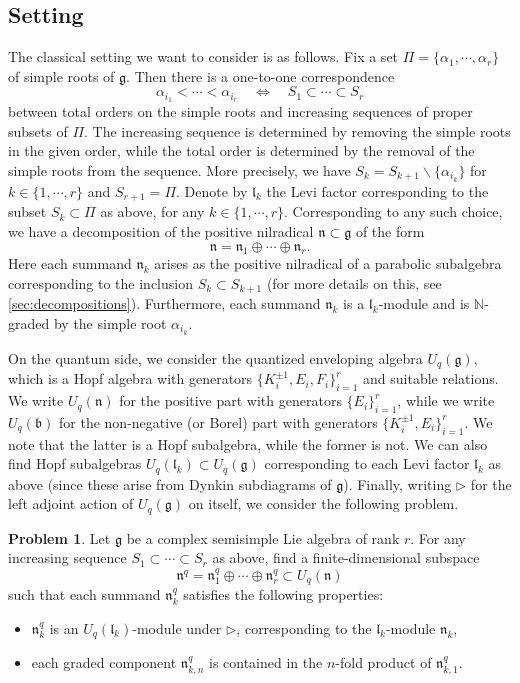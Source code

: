 \documentclass[a4paper, 12pt, reqno, english]{amsart}
\numberwithin{equation}{section}
\numberwithin{figure}{section}
\theoremstyle{plain}
\theoremstyle{plain}
\theoremstyle{plain}
\theoremstyle{plain}
\theoremstyle{plain}
\theoremstyle{definition}
\theoremstyle{definition}
\theoremstyle{definition}
\theoremstyle{remark}
\theoremstyle{definition}
\newtheorem{problem}[theorem]{Problem}
\theoremstyle{definition}
\newcommand{\Uqb}{U_q(\mathfrak{b})}
\newcommand{\Uqg}{U_q(\mathfrak{g})}
\newcommand{\Uqn}{U_q(\mathfrak{n})}
\newcommand{\Uqlk}{U_q(\mathfrak{l}_k)}
\newcommand{\bbN}{\mathbb{N}}
\newcommand{\lieg}{\mathfrak{g}}
\newcommand{\liel}{\mathfrak{l}}
\newcommand{\lien}{\mathfrak{n}}
\newcommand{\simpleroots}{\Pi}
\newcommand{\qnil}{\lien^q}
\begin{document}
\subsection{Setting}

The classical setting we want to consider is as follows.
Fix a set $\simpleroots = \{ \alpha_1, \cdots, \alpha_r \}$ of simple roots of $\lieg$.
Then there is a one-to-one correspondence
\[
\alpha_{i_1} < \cdots < \alpha_{i_r}
\quad \Longleftrightarrow \quad
S_1 \subset \cdots \subset S_r
\]
between total orders on the simple roots and increasing sequences of proper subsets of $\simpleroots$.
The increasing sequence is determined by removing the simple roots in the given order, while the total order is determined by the removal of the simple roots from the sequence.
More precisely, we have $S_k = S_{k + 1} \backslash \{\alpha_{i_k}\}$ for $k \in \{ 1, \cdots, r \}$ and $S_{r + 1} = \simpleroots$.
Denote by $\liel_k$ the Levi factor corresponding to the subset $S_k \subset \simpleroots$ as above, for any $k \in \{ 1, \cdots, r \}$.
Corresponding to any such choice, we have a decomposition of the positive nilradical $\lien \subset \lieg$ of the form
\[
\lien = \lien_1 \oplus \cdots \oplus \lien_r.
\]
Here each summand $\lien_k$ arises as the positive nilradical of a parabolic subalgebra corresponding to the inclusion $S_k \subset S_{k + 1}$ (for more details on this, see \cref{sec:decompositions}).
Furthermore, each summand $\lien_k$ is a $\liel_k$-module and is $\bbN$-graded by the simple root $\alpha_{i_k}$.

On the quantum side, we consider the quantized enveloping algebra $\Uqg$, which is a Hopf algebra with generators $\{ K_i^{\pm 1}, E_i, F_i \}_{i = 1}^r$ and suitable relations.
We write $\Uqn$ for the positive part with generators $\{ E_i \}_{i = 1}^r$, while we write $\Uqb$ for the non-negative (or Borel) part with generators $\{ K_i^{\pm 1}, E_i \}_{i = 1}^r$.
We note that the latter is a Hopf subalgebra, while the former is not.
We can also find Hopf subalgebras $\Uqlk \subset \Uqg$ corresponding to each Levi factor $\liel_k$ as above (since these arise from Dynkin subdiagrams of $\lieg$).
Finally, writing $\triangleright$ for the left adjoint action of $\Uqg$ on itself, we consider the following problem.

\begin{problem}
\label{prob:quantization}
Let $\lieg$ be a complex semisimple Lie algebra of rank $r$.
For any increasing sequence $S_1 \subset \cdots \subset S_r$ as above, find a finite-dimensional subspace
\[
\qnil = \qnil_1 \oplus \cdots \oplus \qnil_r \subset \Uqn
\]
such that each summand $\qnil_k$ satisfies the following properties:
\begin{itemize}
\item $\qnil_k$ is an $U_q(\liel_k)$-module under $\triangleright$, corresponding to the $\liel_k$-module $\lien_k$,
\item each graded component $\qnil_{k, n}$ is contained in the $n$-fold product of $\qnil_{k, 1}$.
\end{itemize}
\end{problem}
\end{document}

